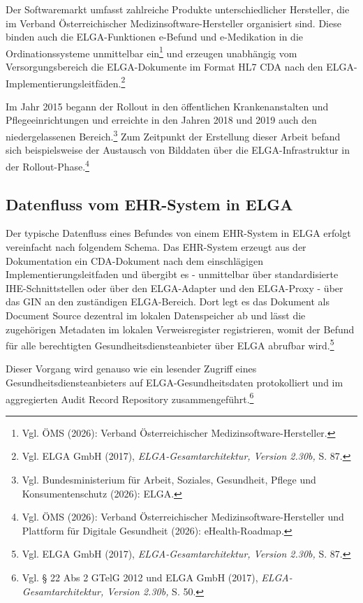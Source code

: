 Der Softwaremarkt umfasst zahlreiche Produkte unterschiedlicher Hersteller, die im Verband Österreichischer Medizinsoftware-Hersteller organisiert sind. Diese binden auch die ELGA-Funktionen e-Befund und e-Medikation in die Ordinationssysteme  unmittelbar ein\footnote{Vgl. ÖMS (2026): Verband Österreichischer Medizinsoftware-Hersteller.} und erzeugen unabhängig vom Versorgungsbereich die ELGA-Dokumente im Format HL7 CDA nach den ELGA-Implementierungsleitfäden.\footnote{Vgl.  ELGA GmbH (2017), \textit{ELGA-Gesamtarchitektur, Version 2.30b,} S. 87.}

 Im Jahr 2015 begann der Rollout in den öffentlichen Krankenanstalten und Pflegeeinrichtungen und erreichte in den Jahren 2018 und 2019 auch den niedergelassenen Bereich.\footnote{Vgl. Bundesministerium für Arbeit, Soziales, Gesundheit, Pflege und Konsumentenschutz (2026): ELGA.} Zum Zeitpunkt der Erstellung dieser Arbeit befand sich beispielsweise der Austausch von Bilddaten über die ELGA-Infrastruktur in der Rollout-Phase.\footnote{Vgl. ÖMS (2026): Verband Österreichischer Medizinsoftware-Hersteller und Plattform für Digitale Gesundheit (2026): eHealth-Roadmap.}

    \subsection{Datenfluss vom EHR-System in ELGA}
Der typische Datenfluss eines Befundes von einem EHR-System in ELGA erfolgt vereinfacht nach folgendem Schema. Das EHR-System erzeugt aus der Dokumentation ein CDA-Dokument nach dem einschlägigen Implementierungsleitfaden und übergibt es - unmittelbar über standardisierte IHE-Schnittstellen oder über den ELGA-Adapter und den ELGA-Proxy - über das GIN an den zuständigen ELGA-Bereich. Dort legt es das Dokument als Document Source dezentral im lokalen Datenspeicher ab und lässt die zugehörigen Metadaten im lokalen Verweisregister registrieren, womit der Befund für alle berechtigten Gesundheitsdiensteanbieter über ELGA abrufbar wird.\footnote{Vgl.  ELGA GmbH (2017), \textit{ELGA-Gesamtarchitektur, Version 2.30b,} S. 87.}

Dieser Vorgang wird genauso wie ein lesender Zugriff eines Gesundheitsdiensteanbieters auf ELGA-Gesundheitsdaten protokolliert und im aggregierten Audit Record Repository zusammengeführt.\footnote{Vgl. § 22 Abs 2 GTelG 2012 und ELGA GmbH (2017), \textit{ELGA-Gesamtarchitektur, Version 2.30b,} S. 50.}

